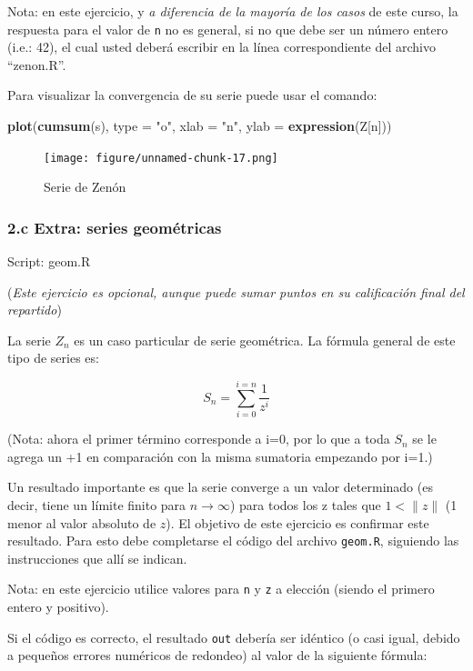 \documentclass[]{article}
\newenvironment{Shaded}{}{}
\newcommand{\KeywordTok}[1]{\textcolor[rgb]{0.00,0.44,0.13}{\textbf{{#1}}}}
\newcommand{\DataTypeTok}[1]{\textcolor[rgb]{0.56,0.13,0.00}{{#1}}}
\newcommand{\StringTok}[1]{\textcolor[rgb]{0.25,0.44,0.63}{{#1}}}
\newcommand{\NormalTok}[1]{{#1}}
\begin{document}
Nota: en este ejercicio, y \emph{a diferencia de la mayoría de los
casos} de este curso, la respuesta para el valor de \texttt{n} no es
general, si no que debe ser un número entero (i.e.: 42), el cual usted
deberá escribir en la línea correspondiente del archivo ``zenon.R''.

Para visualizar la convergencia de su serie puede usar el comando:

\begin{Shaded}
\begin{Highlighting}[]
\KeywordTok{plot}\NormalTok{(}\KeywordTok{cumsum}\NormalTok{(s), }\DataTypeTok{type =} \StringTok{"o"}\NormalTok{, }\DataTypeTok{xlab =} \StringTok{"n"}\NormalTok{, }\DataTypeTok{ylab =} \KeywordTok{expression}\NormalTok{(Z[n]))}
\end{Highlighting}
\end{Shaded}
\begin{figure}[htbp]
\centering
\texttt{[image: figure/unnamed-chunk-17.png]}
\caption{Serie de Zenón}
\end{figure}

\subsubsection{2.c Extra: series geométricas}

Script: geom.R

(\emph{Este ejercicio es opcional, aunque puede sumar puntos en su
calificación final del repartido})

La serie $Z_n$ es un caso particular de serie geométrica. La fórmula
general de este tipo de series es:

\[
  S_n = \sum_{i=0}^{i=n} \frac{1}{z ^ i}
\]

(Nota: ahora el primer término corresponde a i=0, por lo que a toda
$S_n$ se le agrega un +1 en comparación con la misma sumatoria empezando
por i=1.)

Un resultado importante es que la serie converge a un valor determinado
(es decir, tiene un límite finito para $n \to \infty$) para todos los z
tales que $1 < \|z\|$ (1 menor al valor absoluto de $z$). El objetivo de
este ejercicio es confirmar este resultado. Para esto debe completarse
el código del archivo \texttt{geom.R}, siguiendo las instrucciones que
allí se indican.

Nota: en este ejercicio utilice valores para \texttt{n} y \texttt{z} a
elección (siendo el primero entero y positivo).

Si el código es correcto, el resultado \texttt{out} debería ser idéntico
(o casi igual, debido a pequeños errores numéricos de redondeo) al valor
de la siguiente fórmula:
\end{document}
